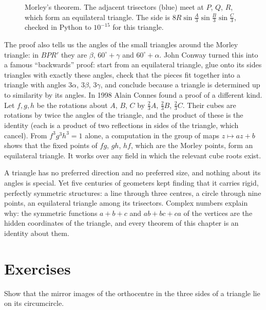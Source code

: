 \begin{figure}[ht]
\centering
{}
\caption{Morley's theorem. The adjacent trisectors (blue) meet at $P$, $Q$, $R$, which form an equilateral triangle. The side is
$8R\sin\frac A3\sin\frac B3\sin\frac C3$, checked in Python to $10^{-15}$ for this triangle.}
\label{geometry:fig:morley}
\end{figure}

The proof also tells us the angles of the small triangles around the Morley triangle: in $BPR'$ they are $\beta$, $60^\circ+\gamma$ and
$60^\circ+\alpha$. John Conway turned this into a famous ``backwards'' proof: start from an equilateral triangle, glue onto its sides
triangles with exactly these angles, check that the pieces fit together into a triangle with angles $3\alpha$, $3\beta$, $3\gamma$, and
conclude because a triangle is determined up to similarity by its angles. In 1998 Alain Connes found a proof of a different kind. Let
$f,g,h$ be the rotations about $A$, $B$, $C$ by $\frac23A$, $\frac23B$, $\frac23C$. Their cubes are rotations by twice the angles of the
triangle, and the product of these is the identity (each is a product of two reflections in sides of the triangle, which cancel).
From $f^3g^3h^3=1$ alone, a computation in the group of maps $z\mapsto az+b$ shows that the fixed points of $fg$, $gh$, $hf$, which are the
Morley points, form an equilateral triangle. It works over any field in which the relevant cube roots exist.

\begin{beauty}
A triangle has no preferred direction and no preferred size, and nothing about its angles is special. Yet five centuries of geometers
kept finding that it carries rigid, perfectly symmetric structures: a line through three centres, a circle through nine points, an
equilateral triangle among its trisectors. Complex numbers explain why: the symmetric functions $a+b+c$ and $ab+bc+ca$ of the vertices
are the hidden coordinates of the triangle, and every theorem of this chapter is an identity about them.
\end{beauty}

\section{Exercises}

\begin{exercise}[$\star$]\label{geometry:ex:reflectH}
Show that the mirror images of the orthocentre in the three sides of a triangle lie on its circumcircle.
\end{exercise}

